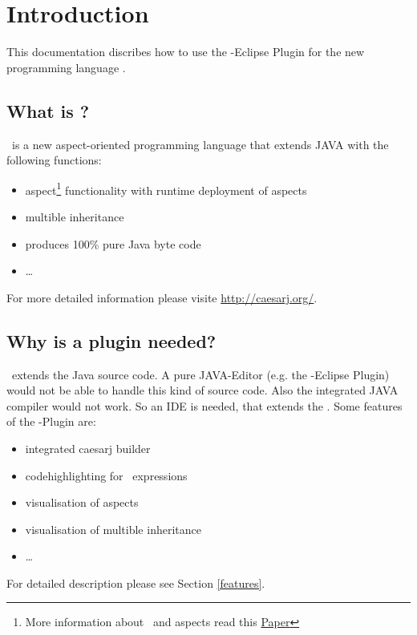 \section{Introduction}
This documentation discribes how to use the \caesarj -Eclipse Plugin for the new programming language \caesarj.
\subsection{What is \caesarj ?}
\caesar ~is a new aspect-oriented programming language that extends JAVA with the following functions:
\begin{itemize}
	\item aspect\footnote{More information about \caesarj ~and aspects read this  \href{http://www.st.informatik.tu-darmstadt.de/database/publications/data/aosd03.pdf?id=70}{Paper}} functionality with runtime deployment of aspects
	\item multible inheritance
	\item produces 100\% pure Java byte code
	\item \dots
\end{itemize}
For more detailed information please visite \href{http://caesarj.org/}{http://caesarj.org/}.

\subsection{Why is a plugin needed?}
\caesarj ~extends the Java source code. A pure JAVA-Editor (e.g. the \jdt -Eclipse Plugin) would not be able to handle this kind of source code. Also the integrated JAVA compiler would not work. So an IDE is needed, that extends the \jdt. Some features of the \caesarj -Plugin are:
\begin{itemize}
	\item integrated caesarj builder
	\item codehighlighting for \caesarj ~expressions
	\item visualisation of aspects
	\item visualisation of multible inheritance
	\item \dots
\end{itemize}
For detailed description please see Section \ref{features}.


